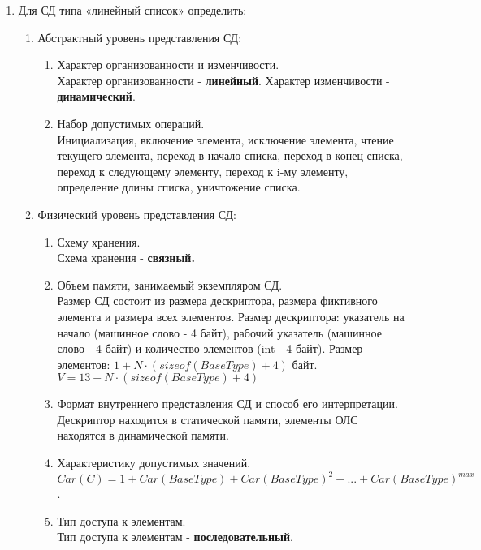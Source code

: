 \documentclass[a4paper,14pt]{extarticle}
\begin{document}
\begin{enumerate}
	\item Для СД типа «линейный список» определить:
	      \begin{enumerate}[label*=\arabic*.]
		      \item Абстрактный уровень представления СД:

		            \begin{enumerate}[label*=\arabic*.]
			            \item Характер организованности и изменчивости.\\
			            Характер организованности - \textbf{линейный}. Характер изменчивости - \textbf{динамический}.
			            \item Набор допустимых операций.\\
			            Инициализация, включение элемента, исключение элемента,
                        чтение текущего элемента,
                        переход в начало списка,
                        переход в конец списка,
                        переход к следующему элементу,
                        переход к i-му элементу,
                        определение длины списка,
                        уничтожение списка.
		            \end{enumerate}

		      \item Физический уровень представления СД:

		            \begin{enumerate}[label*=\arabic*.]
			            \item Схему хранения.\\
			            Схема хранения - \textbf{связный.}
			            \item Объем памяти, занимаемый экземпляром СД.\\
			            Размер СД состоит из размера дескриптора, размера фиктивного элемента и размера всех элементов.
                        Размер дескриптора: указатель на начало (машинное слово - 4 байт), рабочий указатель (машинное слово - 4 байт) и количество элементов (int - 4 байт).
                        Размер элементов: $1 + N\cdot(sizeof(BaseType) + 4)$ байт.
                        $V = 13 + N\cdot(sizeof(BaseType) + 4)$
			            \item Формат внутреннего представления СД и способ его интерпретации.\\
			            Дескриптор находится в статической памяти, элементы ОЛС находятся в динамической памяти.
			            \item Характеристику допустимых значений.\\
			            $Car(C) = 1 + Car(BaseType) + Car(BaseType) ^ 2 + ... + Car(BaseType) ^ {max}$.
			            \item Тип доступа к элементам.\\
						Тип доступа к элементам - \textbf{последовательный}.
		            \end{enumerate}


\end{enumerate}
\end{enumerate}
\end{document}
